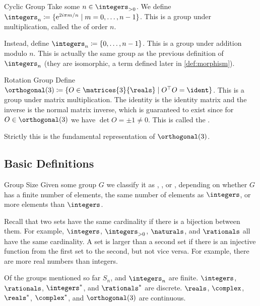 \begin{exm}{Cyclic Group}{}
    Take some \(n \in \positiveintegers\).
    We define \(\integers_n \coloneqq \{\e^{2i\pi m/n} \mid m = 0, \dotsc, n - 1\}\).
    This is a group under multiplication, called the  of order \(n\).
    
    Instead, define \(\integers_n \coloneqq \{0, \dotsc, n - 1\}\).
    This is a group under addition modulo \(n\).
    This is actually the same group as the previous definition of \(\integers_n\) (they are isomorphic, a term defined later in \cref{def:morphism}).
\end{exm}

\begin{exm}{Rotation Group}{}
    Define \(\orthogonal(3) \coloneqq \{ O \in \matrices{3}{\reals} \mid  O^\trans O = \ident\}\).
    This is a group under matrix multiplication.
    The identity is the identity matrix and the inverse is the normal matrix inverse, which is guaranteed to exist since for \(O \in \orthogonal(3)\) we have \(\det O = \pm 1 \ne 0\).
    This is called the .
    
    \begin{rmk}
        Strictly this is the fundamental representation of \(\orthogonal(3)\).
    \end{rmk}
\end{exm}

\subsection{Basic Definitions}
\begin{dfn}{Group Size}{}
    Given some group \(G\) we classify it as , , or , depending on whether \(G\) has a finite number of elements, the same number of elements as \(\integers\), or more elements than \(\integers\).
\end{dfn}

Recall that two sets have the same cardinality if there is a bijection between them.
For example, \(\integers\), \(\positiveintegers\), \(\naturals\), and \(\rationals\) all have the same cardinality.
A set is larger than a second set if there is an injective function from the first set to the second, but not vice versa.
For example, there are more real numbers than integers.

\begin{exm}{}{}
    Of the groups mentioned so far \(S_n\), and \(\integers_n\) are finite.
    \(\integers\), \(\rationals\), \(\integers^*\), and \(\rationals^*\) are discrete.
    \(\reals\), \(\complex\), \(\reals^*\), \(\complex^*\), and \(\orthogonal(3)\) are continuous.
\end{exm}

